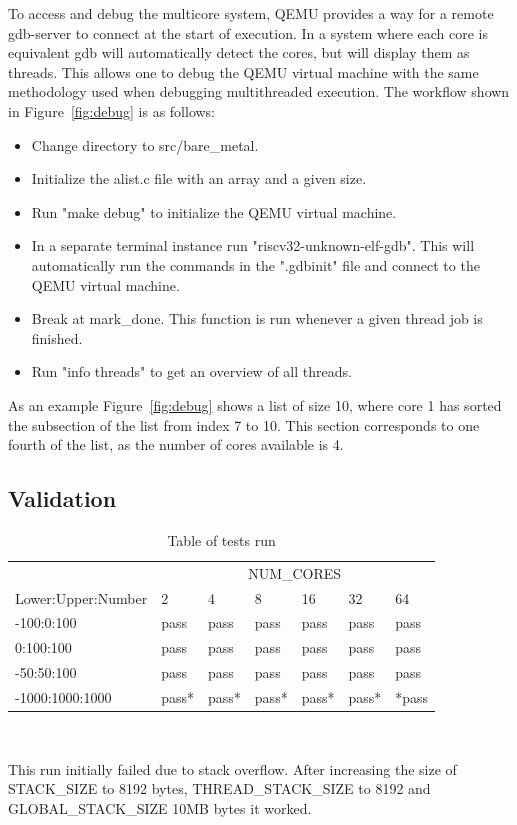 To access and debug the multicore system, QEMU provides a way for a remote
gdb-server to connect at the start of execution.\cite{QEMU} In a system where
each core is equivalent gdb will automatically detect the cores, but will
display them as threads. This allows one to debug the QEMU virtual machine with
the same methodology used when debugging multithreaded execution. The workflow shown in Figure~\ref{fig:debug} is as follows:
\begin{itemize}
  \item Change directory to src/bare\_metal.
  \item Initialize the alist.c file with an array and a given size.
  \item Run "make debug" to initialize the QEMU virtual machine.
  \item In a separate terminal instance run "riscv32-unknown-elf-gdb". This will
    automatically run the commands in the ".gdbinit" file and connect to the
    QEMU virtual machine.
  \item Break at mark\_done. This function is run whenever a given thread job is
    finished.
  \item Run "info threads" to get an overview of all threads.
\end{itemize}
As an example Figure~\ref{fig:debug} shows a list of size 10, where core 1 has
sorted the subsection of the list from index 7 to 10. This section corresponds
to one fourth of the list, as the number of cores available is 4.

\subsection{Validation}\label{sec:validate}
\begin{table}
  \caption{Table of tests run}\label{tab:tests}
  \begin{center}
    \begin{tabular}[c]{l|l|l|l|l|l|l}
      & \multicolumn{6}{c}{NUM\_CORES}\\
      \cline{2-7}
      Lower:Upper:Number & 2 & 4 & 8 & 16 & 32 & 64\\
      \hline
      -100:0:100 & pass & pass & pass & pass & pass & pass \\
      \hline
      0:100:100 & pass & pass & pass & pass & pass & pass\\
      \hline
      -50:50:100 & pass & pass & pass & pass & pass & pass \\
      \hline
      -1000:1000:1000 & pass* & pass* & pass* & pass* & pass* & *pass
    \end{tabular} \\
    \vspace{1em}
    \raggedright{\footnotesize *This run initially failed due to stack overflow. After
    increasing the size of STACK\_SIZE to 8192 bytes, THREAD\_STACK\_SIZE to
  8192 and GLOBAL\_STACK\_SIZE 10MB bytes it worked.} \\
  \end{center}
\end{table}

